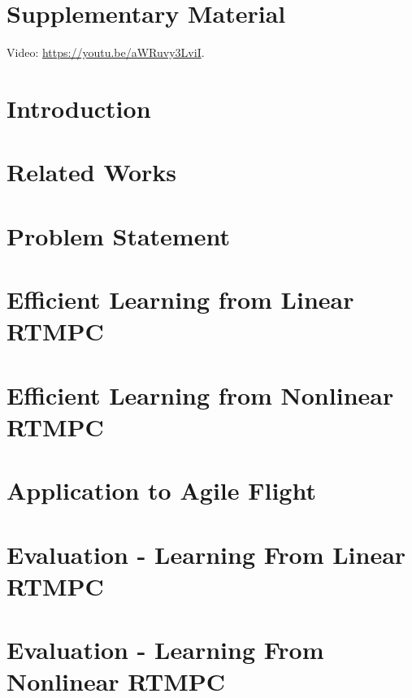 \documentclass[letterpaper, 10 pt, journal, twoside]{IEEEtran}
\begin{document}
\section*{Supplementary Material}
Video: \url{https://youtu.be/aWRuvy3LviI}.

\acresetall
\section{Introduction} \label{sec:introduction}


\section{Related Works} \label{sec:related_works}


\section{Problem Statement} \label{sec:imitation}


\section{Efficient Learning from Linear RTMPC} \label{sec:rtmpc_linear}


\section{Efficient Learning from Nonlinear RTMPC} \label{sec:rtmpc_nonlinear}


\section{Application to Agile Flight} \label{sec:agile_flight}


\section{Evaluation - Learning From Linear RTMPC} \label{sec:evaluation_linear}


\section{Evaluation - Learning From Nonlinear RTMPC} \label{sec:evaluation_nonlinear}

\end{document}
